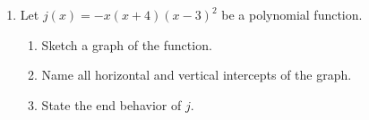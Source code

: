 \documentclass[12pt, twoside]{article}
\begin{document}
\begin{enumerate}
\item Let $j(x)=-x(x+4)(x-3)^2$ be a polynomial function. 
    \begin{center}
    \end{center}
    \begin{enumerate}[itemsep=0.25cm]
        \item Sketch a graph of the function.
        \item Name all horizontal and vertical intercepts of the graph.
        \item State the end behavior of $j$.
    \end{enumerate}
        

\end{enumerate}
\end{document}

